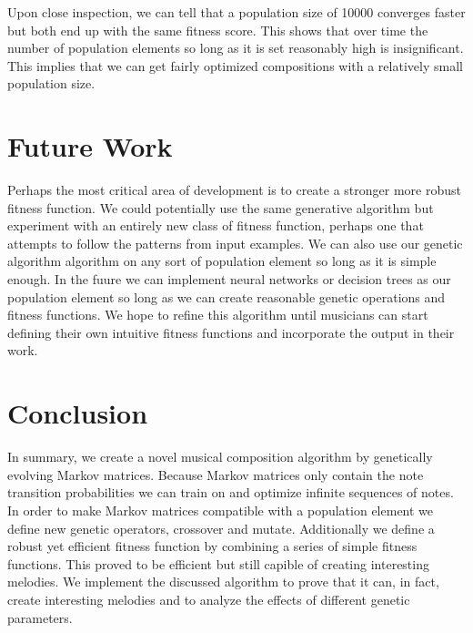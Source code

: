 \documentclass{article}
\begin{document}
Upon close inspection, we can tell that a population size of 10000 converges faster but both end up with the same fitness score. This shows that over time the number of population elements so long as it is set reasonably high is insignificant. This implies that we can get fairly optimized compositions with a relatively small population size. 

\section{Future Work}

Perhaps the most critical area of development is to create a stronger more robust fitness function. We could potentially use the same generative algorithm but experiment with an entirely new class of fitness function, perhaps one that attempts to follow the patterns from input examples. We can also use our genetic algorithm algorithm on any sort of population element so long as it is simple enough. In the fuure we can implement neural networks or decision trees as our population element so long as we can create reasonable genetic operations and fitness functions. We hope to refine this algorithm until musicians can start defining their own intuitive fitness functions and incorporate the output in their work.

\section{Conclusion}

In summary, we create a novel musical composition algorithm by genetically evolving Markov matrices. Because Markov matrices only contain the note transition probabilities we can train on and optimize infinite sequences of notes. In order to make Markov matrices compatible with a population element we define new genetic operators, crossover and mutate. Additionally we define a robust yet efficient fitness function by combining a series of simple fitness functions. This proved to be efficient but still capible of creating interesting melodies. We implement the discussed algorithm to prove that it can, in fact, create interesting melodies and to analyze the effects of different genetic parameters.




\end{document}
